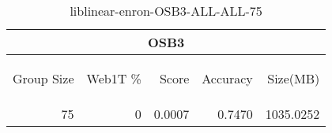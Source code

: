 \begin{center}
\begin{table}[htbp]
\begin{tabular}{ | r | r | r | r | r |}
\hline
\multicolumn{5}{|c|}{OSB3}\\
\hline
\begin{sideways}Group Size\end{sideways} & \begin{sideways}Web1T \%\end{sideways} & \begin{sideways}Score\end{sideways} & \begin{sideways}Accuracy\end{sideways} & \begin{sideways}Size(MB)\end{sideways}\\
\hline
\multirow{0}{*}{75}
 & 0 & 0.0007 & 0.7470 & 1035.0252\\ \cline{2-5}
\hline
\end{tabular}
\caption{liblinear-enron-OSB3-ALL-ALL-75}
\label{table:liblinear-enron-OSB3-ALL-ALL-75}
\end{table}
\end{center}

